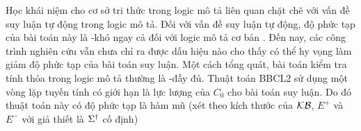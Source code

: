 \begin{Remark}
Học khái niệm cho cơ sở tri thức trong logic mô tả liên quan chặt chẽ với vấn đề suy luận tự động trong logic mô tả. Đối với vấn đề suy luận tự động, độ phức tạp của bài toán này là \EXPTIME-khó ngay cả đối với logic mô tả cơ bản \ALC. Đến nay, các công trình nghiên cứu vẫn chưa chỉ ra được dấu hiệu nào cho thấy có thể hy vọng làm giảm độ phức tạp của bài toán suy luận. Một cách tổng quát, bài toán 
kiểm tra tính thỏa trong logic mô tả thường là \EXPTIME-đầy đủ.
Thuật toán BBCL2 sử dụng một vòng lặp tuyến tính có giới hạn là lực lượng của $C_0$ cho bài toán suy luận. Do đó thuật toán này có độ phức tạp là hàm mũ (xét theo kích thước của $\mathcal{KB}$, $E^+$ và $E^-$ với giả thiết là $\Sigma^\dag$ cố định)
\end{Remark}

